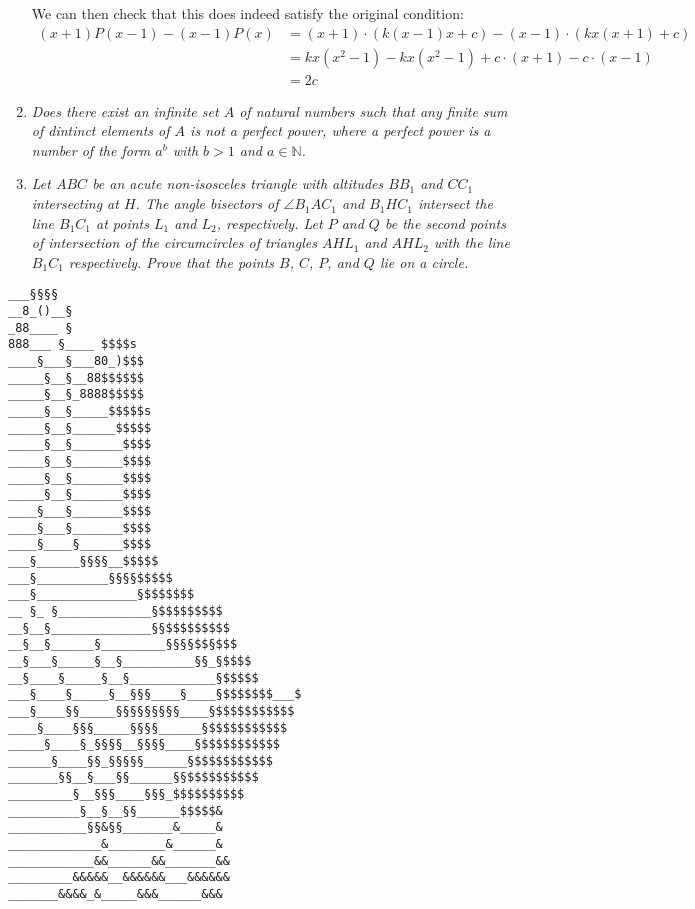 \documentclass{article}
\begin{document}
\begin{enumerate}[1.]
We can then check that this does indeed satisfy the original condition:
\begin{align*}
  (x + 1)P(x - 1) - (x - 1)P(x) &= (x + 1) \cdot (k(x - 1)x + c) - (x - 1) \cdot (kx(x + 1) + c) \\
  &= kx(x^2 - 1) - kx(x^2 - 1) + c \cdot (x + 1) - c \cdot (x - 1) \\
  &= 2c
\end{align*}

\item %
{\itshape Does there exist an infinite set $A$ of natural numbers such that any finite sum of dintinct elements of $A$ is not a perfect power, where a perfect power is a number of the form $a^b$ with $b > 1$ and $a \in \mathbb{N}$.}

\item %
{\itshape Let $ABC$ be an acute non-isosceles triangle with altitudes $BB_1$ and $CC_1$ intersecting at $H$.
The angle bisectors of $\angle B_1AC_1$ and $B_1HC_1$ intersect the line $B_1C_1$ at points $L_1$ and $L_2$, respectively.
Let $P$ and $Q$ be the second points of intersection of the circumcircles of triangles $AHL_1$ and $AHL_2$ with the line $B_1C_1$ respectively.
Prove that the points $B$, $C$, $P$, and $Q$ lie on a circle.}

\end{enumerate}

\vfill
\centering
\tiny
\begin{BVerbatim}
___§§§§
__8_()__§
_88____ §
888___ §____ $$$$s
____§___§___80_)$$$
_____§__§__88$$$$$$
_____§__§_8888$$$$$
_____§__§_____$$$$$s
_____§__§______$$$$$
_____§__§_______$$$$
_____§__§_______$$$$
_____§__§_______$$$$
_____§__§_______$$$$
____§___§_______$$$$
____§___§_______$$$$
____§____§______$$$$
___§______§§§§__$$$$$
___§__________§§§§$$$$$
___§______________§$$$$$$$
__ §_ §_____________§$$$$$$$$$
__§__§______________§§$$$$$$$$$
__§__§______§_________§§§§$$§$$$
__§___§_____§__§__________§§_§$$$$
__§____§_____§__§____________§$$$$$
___§____§_____§__§§§____§____§$$$$$$$___$
___§____§§_____§§§§§§§§§____§$$$$$$$$$$$
____§____§§§_____§§§§______§$$$$$$$$$$$
_____§____§_§§§§__§§§§____§$$$$$$$$$$$
______§____§§_§§§§§______§$$$$$$$$$$$
_______§§__§___§§______§§$$$$$$$$$$
_________§__§§§____§§§_$$$$$$$$$$
__________§__§__§§______$$$$$&
___________§§&§§_______&_____&
_____________&________&______&
____________&&______&&_______&&
_________&&&&&__&&&&&&___&&&&&&
_______&&&&_&_____&&&______&&&
\end{BVerbatim}
\end{document}
